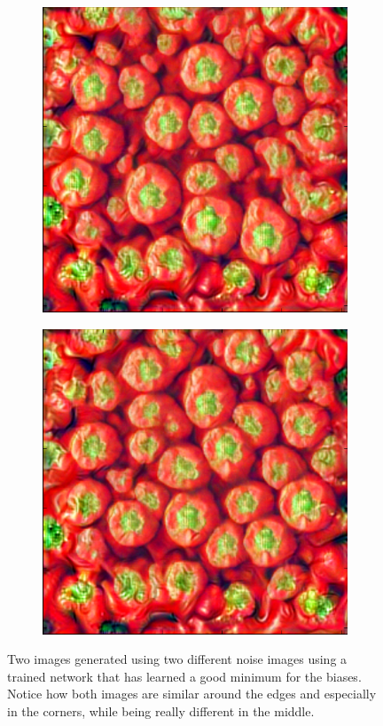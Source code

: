 \documentclass{article}
\begin{document}
\begin{figure}[h]
    \centering
    \begin{subfigure}[b]{0.48\textwidth}
        \includegraphics[width=\textwidth]{overfit1}
    \end{subfigure}
    \begin{subfigure}[b]{0.48\textwidth}
        \includegraphics[width=\textwidth]{overfit2}
    \end{subfigure}
   
    \caption{Two images generated using two different noise images using a trained network that has learned a good minimum for the biases. Notice how both images are similar around the edges and especially in the corners, while being really different in the middle.}\label{fig:overfit}
\end{figure}
\end{document}
